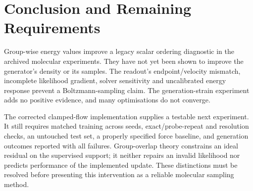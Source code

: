 \section{Conclusion and Remaining Requirements}
\label{sec:limitations}
\label{sec:conclusion}
Group-wise energy values improve a legacy scalar ordering diagnostic in the archived molecular
experiments. They have not yet been shown to improve the generator's density or its samples.
The readout's endpoint/velocity mismatch, incomplete likelihood gradient, solver sensitivity and
uncalibrated energy response prevent a Boltzmann-sampling claim. The generation-strain experiment
adds no positive evidence, and many optimisations do not converge.

The corrected clamped-flow implementation supplies a testable next experiment. It still requires
matched training across seeds, exact/probe-repeat and resolution checks, an untouched test set, a
properly specified force baseline, and generation outcomes reported with all failures. Group-overlap
theory constrains an ideal residual on the supervised support; it neither repairs an invalid
likelihood nor predicts performance of the implemented update. These distinctions must be resolved
before presenting this intervention as a reliable molecular sampling method.
